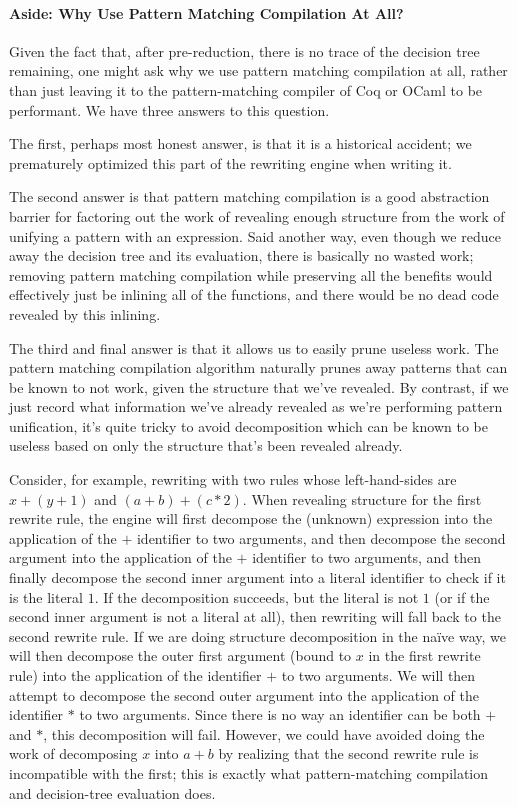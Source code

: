 \paragraph{Aside: Why Use Pattern Matching Compilation At All?}
Given the fact that, after pre-reduction, there is no trace of the decision tree remaining, one might ask why we use pattern matching compilation at all, rather than just leaving it to the pattern-matching compiler of Coq or OCaml to be performant.
We have three answers to this question.

The first, perhaps most honest answer, is that it is a historical accident; we prematurely optimized this part of the rewriting engine when writing it.

The second answer is that pattern matching compilation is a good abstraction barrier for factoring out the work of revealing enough structure from the work of unifying a pattern with an expression.
Said another way, even though we reduce away the decision tree and its evaluation, there is basically no wasted work; removing pattern matching compilation while preserving all the benefits would effectively just be inlining all of the functions, and there would be no dead code revealed by this inlining.

The third and final answer is that it allows us to easily prune useless work.
The pattern matching compilation algorithm naturally prunes away patterns that can be known to not work, given the structure that we've revealed.
By contrast, if we just record what information we've already revealed as we're performing pattern unification, it's quite tricky to avoid decomposition which can be known to be useless based on only the structure that's been revealed already.

Consider, for example, rewriting with two rules whose left-hand-sides are $x + (y + 1)$ and $(a + b) + (c * 2)$.
When revealing structure for the first rewrite rule, the engine will first decompose the (unknown) expression into the application of the $+$ identifier to two arguments, and then decompose the second argument into the application of the $+$ identifier to two arguments, and then finally decompose the second inner argument into a literal identifier to check if it is the literal $1$.
If the decomposition succeeds, but the literal is not $1$ (or if the second inner argument is not a literal at all), then rewriting will fall back to the second rewrite rule.
If we are doing structure decomposition in the naïve way, we will then decompose the outer first argument (bound to $x$ in the first rewrite rule) into the application of the identifier $+$ to two arguments.
We will then attempt to decompose the second outer argument into the application of the identifier $*$ to two arguments.
Since there is no way an identifier can be both $+$ and $*$, this decomposition will fail.
However, we could have avoided doing the work of decomposing $x$ into $a + b$ by realizing that the second rewrite rule is incompatible with the first; this is exactly what pattern-matching compilation and decision-tree evaluation does.

